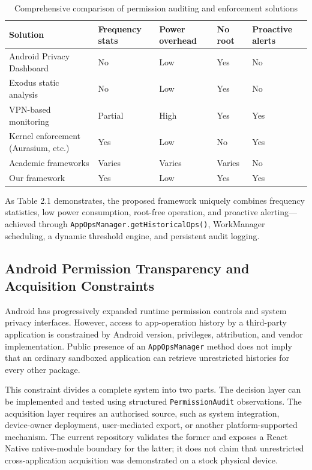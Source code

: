 \begin{table}[H]
\centering
\caption{Comprehensive comparison of permission auditing and enforcement solutions}
\begin{tabular}{p{2.8cm}p{2.2cm}p{2.2cm}p{2.2cm}p{2.2cm}}
\toprule
\textbf{Solution} & \textbf{Frequency stats} & \textbf{Power overhead} & \textbf{No root} & \textbf{Proactive alerts} \\
\midrule
Android Privacy Dashboard & No & Low & Yes & No \\
Exodus static analysis & No & Low & Yes & No \\
VPN-based monitoring & Partial & High & Yes & Yes \\
Kernel enforcement (Aurasium, etc.) & Yes & Low & No & Yes \\
Academic frameworks & Varies & Varies & Varies & No \\
Our framework & Yes & Low & Yes & Yes \\
\bottomrule
\end{tabular}
\end{table}

As Table 2.1 demonstrates, the proposed framework uniquely combines frequency statistics, low power consumption, root-free operation, and proactive alerting—achieved through \texttt{AppOpsManager.getHistoricalOps()}, WorkManager scheduling, a dynamic threshold engine, and persistent audit logging.

\subsection{Android Permission Transparency and Acquisition Constraints}

Android has progressively expanded runtime permission controls and system privacy interfaces. However, access to app-operation history by a third-party application is constrained by Android version, privileges, attribution, and vendor implementation. Public presence of an \texttt{AppOpsManager} method does not imply that an ordinary sandboxed application can retrieve unrestricted histories for every other package.

This constraint divides a complete system into two parts. The decision layer can be implemented and tested using structured \texttt{PermissionAudit} observations. The acquisition layer requires an authorised source, such as system integration, device-owner deployment, user-mediated export, or another platform-supported mechanism. The current repository validates the former and exposes a React Native native-module boundary for the latter; it does not claim that unrestricted cross-application acquisition was demonstrated on a stock physical device.

